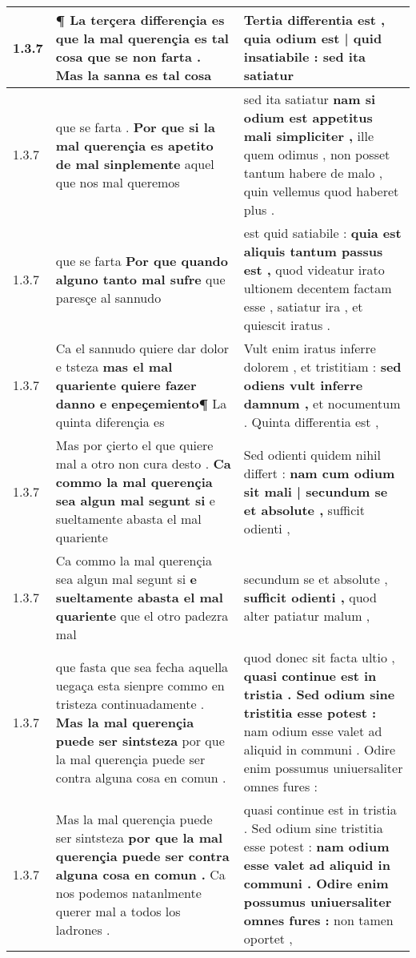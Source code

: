 \begin{tabular}{|p{1cm}|p{6.5cm}|p{6.5cm}|}
1.3.7 & ¶ La terçera differençia es \textbf{ que la mal querençia es tal cosa que se non farta . } Mas la sanna es tal cosa & Tertia differentia est , \textbf{ quia odium est | quid insatiabile : } sed ita satiatur \\\hline
1.3.7 & que se farta . \textbf{ Por que si la mal querençia es apetito de mal sinplemente } aquel que nos mal queremos & sed ita satiatur \textbf{ nam si odium est appetitus mali simpliciter , } ille quem odimus , non posset tantum habere de malo , quin vellemus quod haberet plus . \\\hline
1.3.7 & que se farta \textbf{ Por que quando alguno tanto mal sufre } que paresçe al sannudo & est quid satiabile : \textbf{ quia est aliquis tantum passus est , } quod videatur irato ultionem decentem factam esse , satiatur ira , et quiescit iratus . \\\hline
1.3.7 & Ca el sannudo quiere dar dolor e tsteza \textbf{ mas el mal quariente quiere fazer danno e enpeçemiento¶ } La quinta diferençia es & Vult enim iratus inferre dolorem , et tristitiam : \textbf{ sed odiens vult inferre damnum , } et nocumentum . Quinta differentia est , \\\hline
1.3.7 & Mas por çierto el que quiere mal a otro non cura desto . \textbf{ Ca commo la mal querençia sea algun mal segunt si } e sueltamente abasta el mal quariente & Sed odienti quidem nihil differt : \textbf{ nam cum odium sit mali | secundum se et absolute , } sufficit odienti , \\\hline
1.3.7 & Ca commo la mal querençia sea algun mal segunt si \textbf{ e sueltamente abasta el mal quariente } que el otro padezra mal & secundum se et absolute , \textbf{ sufficit odienti , } quod alter patiatur malum , \\\hline
1.3.7 & que fasta que sea fecha aquella uegaça esta sienpre commo en tristeza continuadamente . \textbf{ Mas la mal querençia puede ser sintsteza } por que la mal querençia puede ser contra alguna cosa en comun . & quod donec sit facta ultio , \textbf{ quasi continue est in tristia . Sed odium sine tristitia esse potest : } nam odium esse valet ad aliquid in communi . Odire enim possumus uniuersaliter omnes fures : \\\hline
1.3.7 & Mas la mal querençia puede ser sintsteza \textbf{ por que la mal querençia puede ser contra alguna cosa en comun . } Ca nos podemos natanlmente querer mal a todos los ladrones . & quasi continue est in tristia . Sed odium sine tristitia esse potest : \textbf{ nam odium esse valet ad aliquid in communi . Odire enim possumus uniuersaliter omnes fures : } non tamen oportet , \\\hline

\end{tabular}

